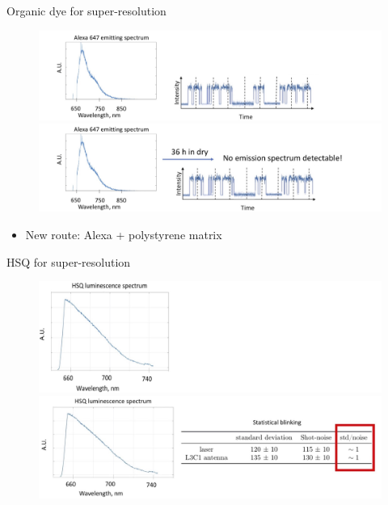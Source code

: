 \documentclass[xcolor = {dvipsnames}]{beamer}
\begin{document}
\begin{frame}{Organic dye for super-resolution}
	\begin{figure}
		\begin{overprint}
		 \centering\includegraphics[width=1.15\textwidth]{images/alexa1}
		\onslide<2>\centering\includegraphics[width=1.15\textwidth]{images/alexa2}
		\end{overprint}
		\end{figure}
		\begin{itemize}
		\item <2-> New route: Alexa + polystyrene matrix
		\end{itemize}
\end{frame}

\begin{frame}[t]{HSQ for super-resolution}
\vspace{1cm}
	\begin{figure}
		\begin{overprint}
		 \centering\includegraphics[width=1\textwidth]{images/hsq}
		\onslide<2>\centering\includegraphics[width=1\textwidth]{images/hsq2}
		\end{overprint}
		\end{figure}
\end{frame}
\end{document}

